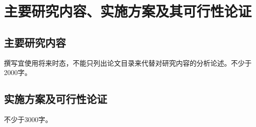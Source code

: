 \section{主要研究内容、实施方案及其可行性论证}

\subsection{主要研究内容}

撰写宜使用将来时态，不能只列出论文目录来代替对研究内容的分析论述。不少于2000字。


\subsection{实施方案及可行性论证}

不少于3000字。
